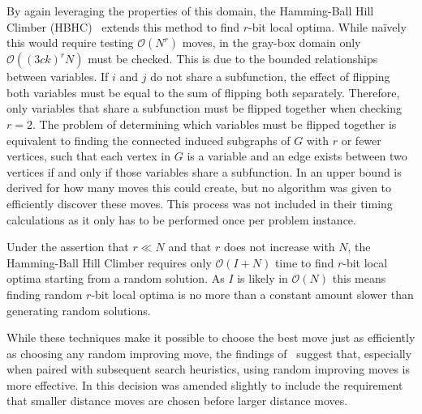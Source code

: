 \documentclass{sig-alternate}
\newcommand{\BigO}[1]{$\mathcal{O}{(#1)}$}
\begin{document}
By again leveraging the properties of this domain, the Hamming-Ball Hill Climber (HBHC)~\cite{chicano:2014:ball} extends this
method to find $r$-bit local optima. While na\"ively this would require testing \BigO{N^r} moves, in the gray-box domain only
\BigO{(3ck)^rN} must be checked. This is due to the bounded relationships between variables.
If $i$ and $j$ do not share a subfunction, the effect of flipping both variables
must be equal to the sum of flipping both separately. Therefore, only variables that share
a subfunction must be flipped together when checking $r=2$. The problem of determining
which variables must be flipped together is equivalent to finding the connected induced
subgraphs of $G$ with $r$ or fewer vertices, such that each vertex in $G$ is a variable
and an edge exists between two vertices if and only if those variables share a subfunction.
In \cite{chicano:2014:ball} an upper bound is derived for how many moves this could create,
but no algorithm was given to efficiently discover these moves. This process was not included
in their timing calculations as it only has to be performed once per problem instance.

Under the assertion that $r \ll N$ and that $r$ does not increase with $N$, the
Hamming-Ball Hill Climber requires only \BigO{I+N} time to find $r$-bit local optima starting
from a random solution. As $I$ is likely in \BigO{N} this means finding random $r$-bit local optima
is no more than a constant amount slower than generating random solutions.

While these techniques make it possible to choose the best move just as efficiently
as choosing any random improving move, the findings of~\cite{whitley:2013:greedy} suggest that,
especially when paired with subsequent search heuristics, using random improving moves is more effective.
In \cite{chicano:2014:ball} this decision was amended slightly to include the requirement that smaller
distance moves are chosen before larger distance moves.
\end{document}

